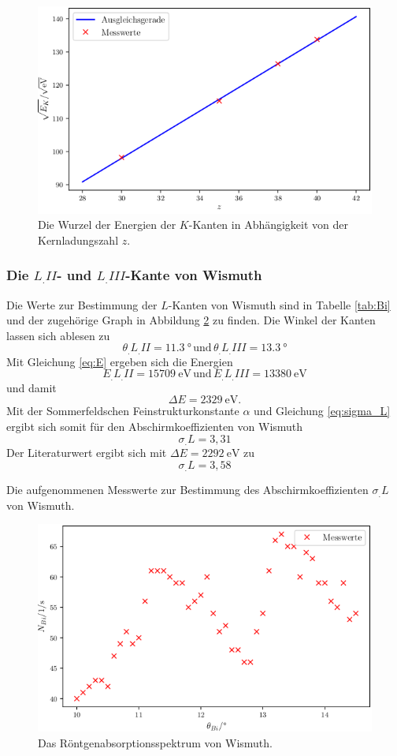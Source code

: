 \begin{figure}
\centering
\includegraphics[width=\linewidth-70pt,height=\textheight-70pt,keepaspectratio]{content/images/Moseley.png}
\caption{Die Wurzel der Energien der $K$-Kanten in Abhängigkeit von der Kernladungszahl $z$.}
\label{fig:Moseley}
\end{figure}
\subsubsection{Die $L_.{II}$- und $L_.{III}$-Kante von Wismuth}
Die Werte zur Bestimmung der $L$-Kanten von Wismuth sind in Tabelle \ref{tab:Bi} und der zugehörige Graph in Abbildung \ref{fig:Bi} zu finden.
Die Winkel der Kanten lassen sich ablesen zu
\[
\theta_.{L_.{II}}=\SI{11,3}{\degree}\, \text{und}\, \theta_.{L_.{III}}=\SI{13,3}{\degree}
\]
Mit Gleichung \eqref{eq:E} ergeben sich die Energien
\[
E_.{L_.{II}}=\SI{15709}{\eV}\, \text{und}\, E_.{L_.{III}}=\SI{13380}{\eV}
\]
und damit
\[
\Delta E = \SI{2329}{\eV}\text{.}
\]
Mit der Sommerfeldschen Feinstrukturkonstante $\alpha$ und Gleichung \eqref{eq:sigma_L}
ergibt sich somit für den Abschirmkoeffizienten von Wismuth
\[
\sigma_.L=3,31
\]
Der Literaturwert ergibt sich mit $\Delta E=\SI{2292}{\eV}$\cite{Bi} zu
\[
\sigma_.L=3,58
\]

\begin{table}
\centering
\caption{Die aufgenommenen Messwerte zur Bestimmung des Abschirmkoeffizienten $\sigma_.L$ von Wismuth.}


\label{tab:Bi}
\end{table}

\begin{figure}
\centering
\includegraphics[width=\linewidth-70pt,height=\textheight-70pt,keepaspectratio]{content/images/Bi.png}
\caption{Das Röntgenabsorptionsspektrum von Wismuth.}
\label{fig:Bi}
\end{figure}
